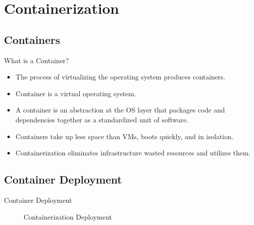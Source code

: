 
\section{Containerization}\label{sec:containerization}

\subsection{Containers}\label{subsec:containers}
\begin{frame}{What is a Container?}
    \begin{itemize}[<+- | alert@+>]
        \item The process of virtualizing the operating system produces containers.
        \item Container is a virtual operating system.
        \item A container is an abstraction at the OS layer that packages code and dependencies together as a standardized unit of software.
        \item Containers take up less space than VMs, boots quickly, and in isolation.
        \item Containerization eliminates infrastructure wasted resources and utilizes them.
    \end{itemize}
\end{frame}

\subsection{Container Deployment}\label{subsec:container-deployment}
\begin{frame}{Container Deployment}
    \begin{figure}[!t]
        \raggedright
        
        \caption{Containerization Deployment}
    \end{figure}
\end{frame}

